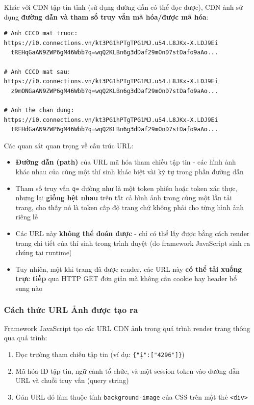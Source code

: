 \documentclass[12pt,a4paper]{article}
\begin{document}
Khác với CDN tập tin tĩnh (sử dụng đường dẫn có thể đọc được), CDN ảnh sử dụng \textbf{đường dẫn và tham số truy vấn mã hóa/được mã hóa}:

\begin{lstlisting}[language={},title={Ví dụ URL CDN ảnh (Thực tế, đã che bớt một phần)}]
# Anh CCCD mat truoc:
https://i0.connections.vn/kt3PG1hPTgTPG1MJ.u54.L8JKx-X.LDJ9Ei
  tREHqGaAN9ZWP6gM46Wbb?q=wqQ2KLBn6g3dDaf29mOnD7stDafo9aAo...

# Anh CCCD mat sau:
https://i0.connections.vn/kt3PG1hPTgTPG1MJ.u54.L8JKx-X.LDJ9Ei
  z9mONGaAN9ZWP6gM46Wbb?q=wqQ2KLBn6g3dDaf29mOnD7stDafo9aAo...

# Anh the chan dung:
https://i0.connections.vn/kt3PG1hPTgTPG1MJ.u54.L8JKx-X.LDJ9Ei
  tREHdGaAN9ZWP6gM46Wbb?q=wqQ2KLBn6g3dDaf29mOnD7stDafo9aAo...
\end{lstlisting}

\noindent Các quan sát quan trọng về cấu trúc URL:
\begin{itemize}
    \item \textbf{Đường dẫn (path)} của URL mã hóa tham chiếu tập tin - các hình ảnh khác nhau của cùng một thí sinh khác biệt vài ký tự trong phần đường dẫn
    \item Tham số truy vấn \texttt{q=} dường như là một token phiên hoặc token xác thực, nhưng lại \textbf{giống hệt nhau} trên tất cả hình ảnh trong cùng một lần tải trang, cho thấy nó là token cấp độ trang chứ không phải cho từng hình ảnh riêng lẻ
    \item Các URL này \textbf{không thể đoán được} - chỉ có thể lấy được bằng cách render trang chi tiết của thí sinh trong trình duyệt (do framework JavaScript sinh ra chúng tại runtime)
    \item Tuy nhiên, một khi trang đã được render, các URL này \textbf{có thể tải xuống trực tiếp} qua HTTP GET đơn giản mà không cần cookie hay header bổ sung nào
\end{itemize}

\subsubsection{Cách thức URL Ảnh được tạo ra}

Framework JavaScript tạo các URL CDN ảnh trong quá trình render trang thông qua quá trình:
\begin{enumerate}[noitemsep]
    \item Đọc trường tham chiếu tập tin (ví dụ: \texttt{\{"ị":["4296"]\}})
    \item Mã hóa ID tập tin, ngữ cảnh tổ chức, và một session token vào đường dẫn URL và chuỗi truy vấn (query string)
    \item Gán URL đó làm thuộc tính \texttt{background-image} của CSS trên một thẻ \texttt{<div>}
\end{enumerate}
\end{document}

